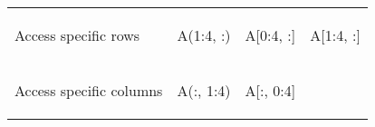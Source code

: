 \documentclass[10pt, landscape]{article}
\newenvironment{Shaded}{}{}
\newcommand{\DecValTok}[1]{\textcolor[rgb]{0.25,0.63,0.44}{{#1}}}
\newcommand{\FloatTok}[1]{\textcolor[rgb]{0.25,0.63,0.44}{{#1}}}
\newcommand{\NormalTok}[1]{{#1}}
\begin{document}
\begin{multicols*}{2}
\begin{tabular}[ ]{@{}llll@{}}
\begin{minipage}[t]{0.23\columnwidth}\raggedright\strut
Access specific rows\strut
\end{minipage} & \begin{minipage}[t]{0.23\columnwidth}\raggedright\strut
\begin{Shaded}
\begin{Highlighting}[]
\NormalTok{A(}\FloatTok{1}\NormalTok{:}\FloatTok{4}\NormalTok{, :)}
\end{Highlighting}
\end{Shaded}
\strut
\end{minipage} & \begin{minipage}[t]{0.23\columnwidth}\raggedright\strut
\begin{Shaded}
\begin{Highlighting}[]
\NormalTok{A[}\DecValTok{0}\NormalTok{:}\DecValTok{4}\NormalTok{, :]}
\end{Highlighting}
\end{Shaded}
\strut
\end{minipage} & \begin{minipage}[t]{0.20\columnwidth}\raggedright\strut
\begin{Shaded}
\begin{Highlighting}[]
\NormalTok{A[}\FloatTok{1}\NormalTok{:}\FloatTok{4}\NormalTok{, :]}
\end{Highlighting}
\end{Shaded}
\strut
\end{minipage}\tabularnewline
\begin{minipage}[t]{0.23\columnwidth}\raggedright\strut
Access specific columns\strut
\end{minipage} & \begin{minipage}[t]{0.23\columnwidth}\raggedright\strut
\begin{Shaded}
\begin{Highlighting}[]
\NormalTok{A(:, }\FloatTok{1}\NormalTok{:}\FloatTok{4}\NormalTok{)}
\end{Highlighting}
\end{Shaded}
\strut
\end{minipage} & \begin{minipage}[t]{0.23\columnwidth}\raggedright\strut
\begin{Shaded}
\begin{Highlighting}[]
\NormalTok{A[:, }\DecValTok{0}\NormalTok{:}\DecValTok{4}\NormalTok{]}
\end{Highlighting}
\end{Shaded}

\end{minipage}
\end{tabular}
\end{multicols*}
\end{document}
